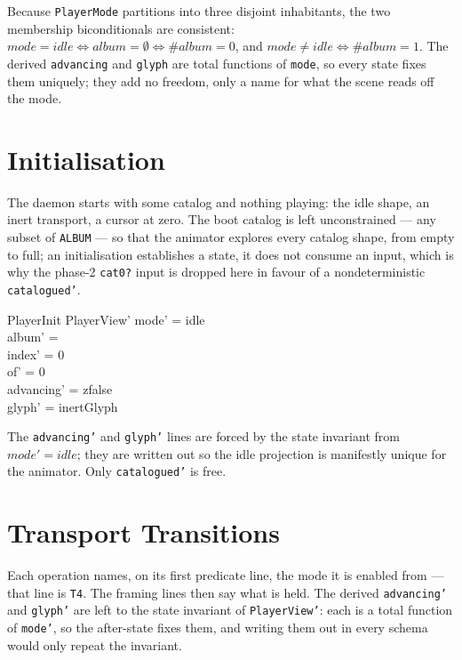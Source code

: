\documentclass[a4paper,10pt,fleqn]{article}
\begin{document}
Because \texttt{PlayerMode} partitions into three disjoint inhabitants, the two
membership biconditionals are consistent: $mode = idle \iff album = \emptyset
\iff \# album = 0$, and $mode \neq idle \iff \# album = 1$. The derived
\texttt{advancing} and \texttt{glyph} are total functions of \texttt{mode}, so
every state fixes them uniquely; they add no freedom, only a name for what the
scene reads off the mode.

\section{Initialisation}

The daemon starts with some catalog and nothing playing: the idle shape, an
inert transport, a cursor at zero. The boot catalog is left unconstrained --- any
subset of \texttt{ALBUM} --- so that the animator explores every catalog shape,
from empty to full; an initialisation establishes a state, it does not consume an
input, which is why the phase-2 \texttt{cat0?} input is dropped here in favour of
a nondeterministic \texttt{catalogued'}.

\begin{schema}{PlayerInit}
  PlayerView'
  \where
  mode' = idle \\
  album' = \emptyset \\
  index' = 0 \\
  of' = 0 \\
  advancing' = zfalse \\
  glyph' = inertGlyph
\end{schema}

The \texttt{advancing'} and \texttt{glyph'} lines are forced by the state
invariant from $mode' = idle$; they are written out so the idle projection is
manifestly unique for the animator. Only \texttt{catalogued'} is free.

\section{Transport Transitions}

Each operation names, on its first predicate line, the mode it is enabled from
--- that line is \texttt{T4}. The framing lines then say what is held. The
derived \texttt{advancing'} and \texttt{glyph'} are left to the state invariant
of \texttt{PlayerView'}: each is a total function of \texttt{mode'}, so the
after-state fixes them, and writing them out in every schema would only repeat
the invariant.
\end{document}

